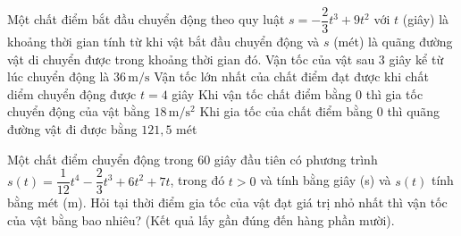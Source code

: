 \begin{ex}%

	Một chất điểm bắt đầu chuyển động theo quy luật $s=-\dfrac{2}{3} t^3 + 9t^2$ với $t$ (giây) là khoảng thời gian tính từ khi vật bắt đầu chuyển động và $s$ (mét) là quãng đường vật di chuyển được trong khoảng thời gian đó.
	\choiceTF
	{\True Vận tốc của vật sau $3$ giây kể từ lúc chuyển động là $36\,\mathrm{m}/\mathrm{s}$}
	{Vận tốc lớn nhất của chất điểm đạt được khi chất diểm chuyển động được $t=4$ giây}
	{Khi vận tốc chất điểm bằng $0$ thì gia tốc chuyển động của vật bằng $18\,\mathrm{m}/\mathrm{s}^2$}
	{\True Khi gia tốc của chất điểm bằng $0$ thì quãng đường vật đi được bằng $121{,}5$ mét}
\end{ex}

\begin{bt}%

    Một chất điểm chuyển động trong $60$ giây đầu tiên có phương trình $s(t)=\dfrac{1}{12}t^4-\dfrac{2}{3}t^3+6t^2+7t$, trong đó $t>0$ và tính bằng giây (s) và $s(t)$ tính bằng mét (m). Hỏi tại thời điểm gia tốc của vật đạt giá trị nhỏ nhất thì vận tốc của vật bằng bao nhiêu? (Kết quả lấy gần đúng đến hàng phần mười).
\end{bt}

